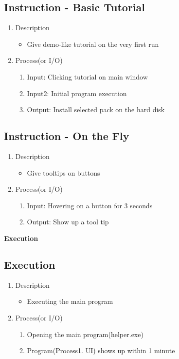 \documentclass[conference]{IEEEtran}
\begin{document}
\textit{}

\subsection{Instruction - Basic Tutorial}
\begin{enumerate}
  \item Description
  \begin{itemize}
    \item Give demo-like tutorial on the very first run
  \end{itemize}
  \item Process(or I/O)
  \begin{enumerate}
    \item Input: Clicking tutorial on main window
    \item Input2: Initial program execution
    \item Output: Install selected pack on the hard disk
  \end{enumerate}
\end{enumerate}


\textit{}

\subsection{Instruction - On the Fly}
\begin{enumerate}
  \item Description
  \begin{itemize}
    \item Give tooltips on buttons
  \end{itemize}
  \item Process(or I/O)
  \begin{enumerate}
    \item Input: Hovering on a button for 3 seconds
    \item Output: Show up a tool tip
  \end{enumerate}
\end{enumerate}

\textit{}

\textbf{Execution}

\subsection{Execution}
\begin{enumerate}
  \item Description
  \begin{itemize}
    \item Executing the main program
  \end{itemize}
  \item Process(or I/O)
  \begin{enumerate}
    \item Opening the main program(helper.exe)
    \item Program(Process1. UI) shows up within 1 minute
  \end{enumerate}
\end{enumerate}
\end{document}
